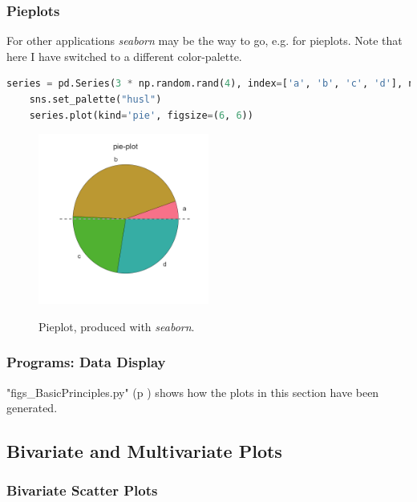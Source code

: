 \subsubsection{Pieplots}

For other applications \emph{seaborn} may be the way to go, e.g. for pieplots. Note that here I have switched to a different color-palette.

\begin{lstlisting}[language=Python]
    series = pd.Series(3 * np.random.rand(4), index=['a', 'b', 'c', 'd'], name='series')
    sns.set_palette("husl")
    series.plot(kind='pie', figsize=(6, 6))
\end{lstlisting}

\begin{figure}[H]
  \centering
  \includegraphics[width=0.5\textwidth]{../Images/pieplot.png}\\
  \caption{Pieplot, produced with \emph{seaborn}.}\label{fig:pieplot}
\end{figure}


\subsubsection{Programs: Data Display}
\PyImg "figs\_BasicPrinciples.py" (p \pageref{py:BasicPrinciples}) shows how the plots in this section have been generated.

\subsection{Bivariate and Multivariate Plots}

\subsubsection{Bivariate Scatter Plots}

